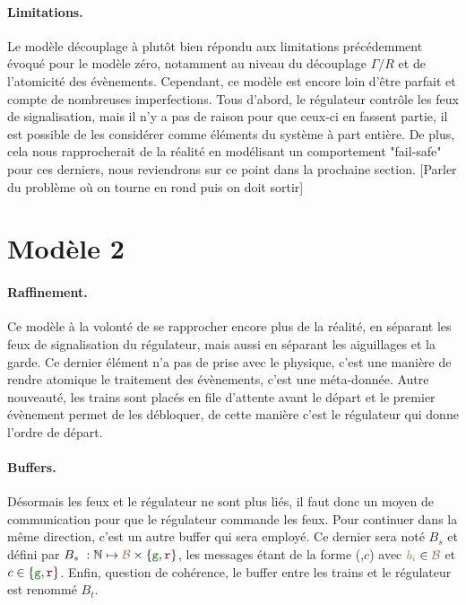 \documentclass[oneside, a4paper, 11pt]{book}
\newcommand{\nats}{\ensuremath{\mathbb{N}}}
\newcommand{\posFmt}[1]{{\color{poscolor}{#1}}}
\newcommand{\sigred}{{\mbox{${\color{red!50!black}\mathtt{r}}$}}}
\newcommand{\siggreen}{{\mbox{${\color{green!50!black}\mathtt{g}}$}}}
\begin{document}
\paragraph{Limitations.}
Le modèle découplage à plutôt bien répondu aux limitations précédemment évoqué pour le modèle zéro, notamment au niveau du découplage $\Gamma/R$ et de l'atomicité des évènements. Cependant, ce modèle est encore loin d'être parfait et compte de nombreuses imperfections.
Tous d'abord, le régulateur contrôle les feux de signalisation, mais il n'y a pas de raison pour que ceux-ci en fassent partie, il est possible de les considérer comme éléments du système à part entière. De plus, cela nous rapprocherait de la réalité en modélisant un comportement "fail-safe" pour ces derniers, nous reviendrons sur ce point dans la prochaine section.
[Parler du problème où on tourne en rond puis on doit sortir]







\section{Modèle 2}
\paragraph{Raffinement.} Ce modèle à la volonté de se rapprocher encore plus de la réalité, en séparant les feux de signalisation du régulateur, mais aussi en séparant les aiguillages et la garde. Ce dernier élément n'a pas de prise avec le physique, c'est une manière de rendre atomique le traitement des évènements, c'est une méta-donnée.
Autre nouveauté, les trains sont placés en file d'attente avant le départ et le premier évènement permet de les débloquer, de cette manière c'est le régulateur qui donne l'ordre de départ.

\paragraph{Buffers.} Désormais les feux et le régulateur ne sont plus liés, il faut donc un moyen de communication pour que le régulateur commande les feux. Pour continuer dans la même direction, c'est un autre buffer qui sera employé.
Ce dernier sera noté \textbf{$B_s$} et défini par $B_s~: \nats \mapsto \posFmt{\mathcal{B}} \times \{\siggreen, \sigred\}$, les messages étant de la forme (\posFmt{$b_i$},$c$) avec $\posFmt{b_i} \in \posFmt{\mathcal{B}}$ et $c \in \{\siggreen, \sigred\}$.
Enfin, question de cohérence, le buffer entre les trains et le régulateur est renommé \textbf{$B_t$}.
\end{document}

